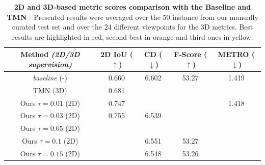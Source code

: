 \begin{table}[htp!]
    \caption{\textbf{2D and 3D-based metric scores comparison with the Baseline and TMN} \citep{pan2019deep} - Presented results were averaged over the 50 instance from our manually curated test set and over the 24 different viewpoints for the 3D metrics. Best results are highlighted in \colorbox{red!25}{red}, second best in \colorbox{orange!25}{orange} and third ones in \colorbox{yellow!25}{yellow}.}
    \label{tab:sota_table}
    \begin{center}
    \centering
    \begin{adjustbox}{width=\textwidth}
    \begin{tabular}[h]{c||cccc}
    \hline
    Method \textit{(2D/3D supervision)} &  2D IoU ($\uparrow$) & CD ($\downarrow$) & F-Score ($\uparrow$) & METRO ($\downarrow$) \\[.5pt]
    \hline
    \textit{baseline} (-)& 0.660  &  6.602  & 53.27  &  1.419  \\[1.5pt]
    TMN \citep{pan2019deep} (3D)  & 0.681  & \cellcolor{red!25}{6.328}   & \cellcolor{red!25}{54.23}  & \cellcolor{red!25}{1.293} \\
    \hline 
    Ours $\scriptstyle \tau=0.01$ (2D) & 0.747 &\cellcolor{yellow!25}{6.541}  &  \cellcolor{orange!25}{53.39} &  1.418      \\
    Ours $\scriptstyle \tau=0.03$ (2D) & 0.755 &6.539  & \cellcolor{orange!25}{53.39}  &    \cellcolor{yellow!25}{1.417}  \\
    Ours $\scriptstyle \tau=0.05$ (2D) & \cellcolor{yellow!25}{0.763} & \cellcolor{orange!25}{6.540}  &  \cellcolor{yellow!25}{53.34} &   \cellcolor{yellow!25}{1.417}     \\
    Ours $\scriptstyle \tau=0.1$ (2D)& \cellcolor{red!25}{0.778} & 6.551  & 53.27 &  \cellcolor{orange!25}{1.416}     \\
    Ours $\scriptstyle \tau=0.15$ (2D)& \cellcolor{orange!25}{0.771} & 6.548  & 53.26  &    \cellcolor{orange!25}{1.416}   \\
    \hline 
    \end{tabular}
    \end{adjustbox}
    \end{center}
    
    \end{table}

